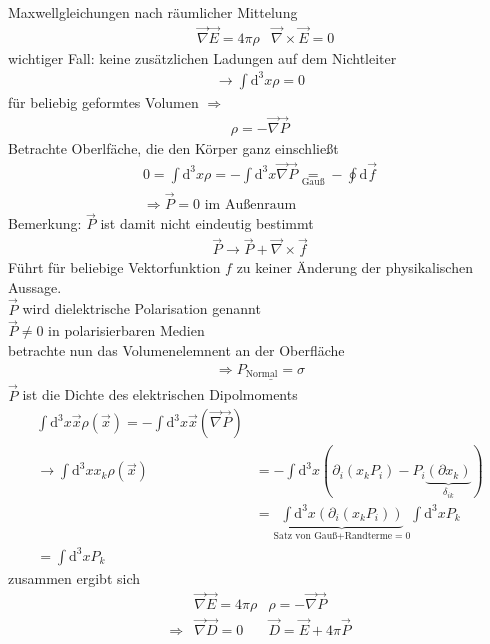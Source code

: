 \documentclass[a4paper]{article}
\begin{document}
Maxwellgleichungen nach räumlicher Mittelung
\begin{align}
&\vec{\nabla}\vec{E}=4\pi\rho&\vec{\nabla}\times\vec{E}=0 
\end{align}
wichtiger Fall: keine zusätzlichen Ladungen auf dem Nichtleiter
\begin{align}
\rightarrow \int \mathrm{d}^3x \rho =0
\end{align}
für beliebig geformtes Volumen $\Rightarrow$
\begin{align}
\rho=-\vec{\nabla}\vec{P}
\end{align}
Betrachte Oberlfäche, die den Körper ganz einschließt
 \begin{align}
 0=\int \mathrm{d}^3x\rho=-\int \mathrm{d}^3x \vec{\nabla}\vec{P}\underset{\text{Gauß}}{=}-\oint
 \mathrm{d}\vec{f}\\
 \Rightarrow
 \vec{P}=0 \text{ im Außenraum}
 \end{align}
Bemerkung: $\vec{P}$ ist damit nicht eindeutig bestimmt
\begin{align}
\vec{P}\rightarrow \vec{P}+\vec{\nabla}\times\vec{f} 
\end{align}
Führt für beliebige Vektorfunktion $f$ zu keiner Änderung der physikalischen
Aussage. \\
$\vec{P}$ wird dielektrische Polarisation genannt\\
$\vec{P}\neq0$ in polarisierbaren Medien\\
betrachte nun das Volumenelemnent an der Oberfläche
\begin{align}
\Rightarrow \underline{P_{\text{Normal}}=\sigma}
\end{align} 
$\vec{P}$ ist die Dichte des elektrischen Dipolmoments
\begin{align}
\int \mathrm{d}^3x \vec{x}\rho(\vec{x})=-\int \mathrm{d}^3x \vec{x}(\vec{\nabla}\vec{P})\\
\rightarrow \int \mathrm{d}^3\!x x_k\rho(\vec{x})&=-\int \mathrm{d}^3x
\left(\partial_i(x_kP_i)-P_i\underbrace{(\partial x_k)}_{\delta_{ik}}\right)\\
&=\underbrace{\int \mathrm{d}^3x\left(\partial_i(x_kP_i)\right)}_{\text{Satz von
Gauß+Randterme}=0} \int \mathrm{d}^3x P_k\\
=\int \mathrm{d}^3x P_k
\end{align}
zusammen ergibt sich
\begin{align}
&\vec{\nabla}\vec{E}=4\pi\rho &\rho=-\vec{\nabla}\vec{P}\\
\Rightarrow &\vec{\nabla}\vec{D}=0 & \vec{D}=\vec{E}+4\pi\vec{P}
\end{align}
\end{document}
